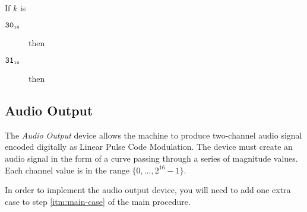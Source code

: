 \documentclass[a4paper,12pt]{article}
\newcommand{\num}[1]{\texttt{#1}}
\newcommand{\hex}[1]{\num{#1}_{\textup{\tiny 16}}}
\newcommand{\range}[2]{\{#1,\ldots,#2\}}
\newcommand{\proc}[1]{\textsc{#1}}
\newcommand{\op}[1]{$#1$}
\newcommand{\NEWFRAME}  [1]{\op{\hex{30}}}
\newcommand{\SETPIXEL}  [1]{\op{\hex{31}}}
\begin{document}
\begin{stepnumbers}[start=3]
\item If $k$ is
  \begin{description}
  \item[\NEWFRAME{}] then
  \item[\SETPIXEL{}] then
  \end{description}
\end{stepnumbers}

\subsection{Audio Output}

The \emph{Audio Output} device allows the machine to produce two-channel audio signal encoded digitally as Linear Pulse Code Modulation.
The device must create an audio signal in the form of a curve passing through a series of magnitude values.
Each channel value is in the range $\range{0}{2^{16}-1}$.

In order to implement the audio output device, you will need to add one extra case to step \ref{itm:main-case} of the main procedure.
\end{document}
